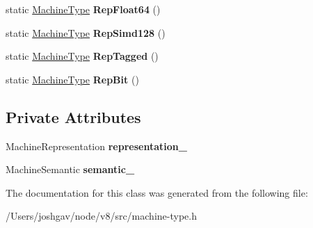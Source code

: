\begin{DoxyCompactItemize}
\item 
static \hyperlink{classv8_1_1internal_1_1_machine_type}{Machine\+Type} {\bfseries Rep\+Float64} ()\hypertarget{classv8_1_1internal_1_1_machine_type_ad3be2b6f94bb87d69be30d7192c79240}{}\label{classv8_1_1internal_1_1_machine_type_ad3be2b6f94bb87d69be30d7192c79240}

\item 
static \hyperlink{classv8_1_1internal_1_1_machine_type}{Machine\+Type} {\bfseries Rep\+Simd128} ()\hypertarget{classv8_1_1internal_1_1_machine_type_ae2a23fa97d9d0d54168b5f6eed5d0749}{}\label{classv8_1_1internal_1_1_machine_type_ae2a23fa97d9d0d54168b5f6eed5d0749}

\item 
static \hyperlink{classv8_1_1internal_1_1_machine_type}{Machine\+Type} {\bfseries Rep\+Tagged} ()\hypertarget{classv8_1_1internal_1_1_machine_type_a25c8b99b288b54a868456ed8c28863bc}{}\label{classv8_1_1internal_1_1_machine_type_a25c8b99b288b54a868456ed8c28863bc}

\item 
static \hyperlink{classv8_1_1internal_1_1_machine_type}{Machine\+Type} {\bfseries Rep\+Bit} ()\hypertarget{classv8_1_1internal_1_1_machine_type_a23c5ab44816acfc3a78abbe50ab675f8}{}\label{classv8_1_1internal_1_1_machine_type_a23c5ab44816acfc3a78abbe50ab675f8}

\end{DoxyCompactItemize}
\subsection*{Private Attributes}
\begin{DoxyCompactItemize}
\item 
Machine\+Representation {\bfseries representation\+\_\+}\hypertarget{classv8_1_1internal_1_1_machine_type_a97196e924718a52bbe815db524a26d1c}{}\label{classv8_1_1internal_1_1_machine_type_a97196e924718a52bbe815db524a26d1c}

\item 
Machine\+Semantic {\bfseries semantic\+\_\+}\hypertarget{classv8_1_1internal_1_1_machine_type_a3bcb869e64d21c564a58a75945e0f07a}{}\label{classv8_1_1internal_1_1_machine_type_a3bcb869e64d21c564a58a75945e0f07a}

\end{DoxyCompactItemize}


The documentation for this class was generated from the following file\+:\begin{DoxyCompactItemize}
\item 
/\+Users/joshgav/node/v8/src/machine-\/type.\+h\end{DoxyCompactItemize}
